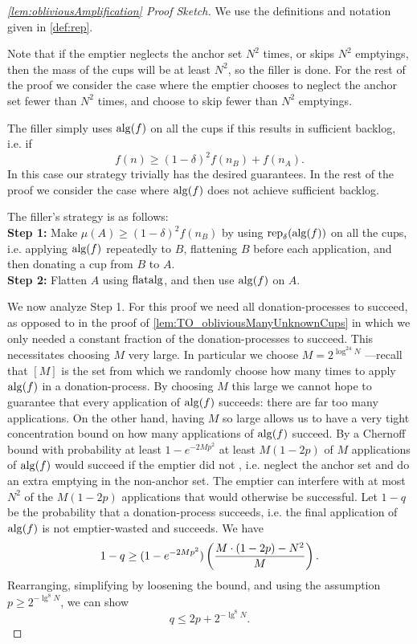\begin{proof}[\cref{lem:obliviousAmplification} Proof Sketch]
  We use the definitions and notation given in \cref{def:rep}. 

  Note that if the emptier neglects the anchor set $N^2$ times,
  or skips $N^2$ emptyings, then the mass of the cups will be at
  least $N^2$, so the filler is done. For the rest of the proof
  we consider the case where the emptier chooses to neglect
  the anchor set fewer than $N^2$ times, and choose to skip fewer
  than $N^2$ emptyings.

  The filler simply uses $\operatorname{\text{\textup{alg}}}(f)$ on all the cups if this
  results in sufficient backlog, i.e. if
  $$f(n) \ge (1-\delta)^2 f(n_B) + f(n_A).$$
  In this case our strategy trivially has the desired guarantees. 
  In the rest of the proof we consider the case where $\operatorname{\text{\textup{alg}}}(f)$
  does not achieve sufficient backlog.

  The filler's strategy is as follows:\\
  \textbf{Step 1:} Make $\mu(A) \ge (1-\delta)^2 f(n_B)$ by
  using $\operatorname{\text{\textup{rep}}}_\delta(\operatorname{\text{\textup{alg}}}(f))$ on all the cups,
  i.e. applying $\operatorname{\text{\textup{alg}}}(f)$ repeatedly to $B$, flattening $B$ before
  each application, and then donating a cup from $B$ to $A$.\\
  \textbf{Step 2:} Flatten $A$ using $\operatorname{\text{\textup{flatalg}}}$, and then use
  $\operatorname{\text{\textup{alg}}}(f)$ on $A$.

  We now analyze Step 1.
  For this proof we need all donation-processes to succeed, as
  opposed to in the proof of
  \cref{lem:TO_obliviousManyUnknownCups} in which we only needed
  a constant fraction of the donation-processes to succeed. This
  necessitates choosing $M$ very large. In particular we choose
  $M = 2^{\log^{24} N}$ ---recall that $[M]$ is the set from
  which we randomly choose how many times to apply $\operatorname{\text{\textup{alg}}}(f)$ in a
  donation-process. By choosing $M$ this large we cannot hope to
  guarantee that every application of $\operatorname{\text{\textup{alg}}}(f)$ succeeds: there
  are far too many applications. On the other hand, having $M$ so
  large allows us to have a very tight concentration bound on how
  many applications of $\operatorname{\text{\textup{alg}}}(f)$ succeed. By a Chernoff bound
  with probability at least $1-e^{-2Mp^2}$ at least $M(1-2p)$ of
  $M$ applications of $\operatorname{\text{\textup{alg}}}(f)$ would succeed if the emptier did
  not , i.e. neglect the anchor set and do an
  extra emptying in the non-anchor set. The emptier can interfere
  with at most $N^2$ of the $M(1-2p)$ applications that would
  otherwise be successful. Let $1-q$ be the probability that a
  donation-process succeeds, i.e. the final application of
  $\operatorname{\text{\textup{alg}}}(f)$ is not emptier-wasted and succeeds. We have $$1-q \ge
  (1-e^{-2Mp^2})\left( \frac{M\cdot (1-2p)-N^2}{M} \right).$$
  Rearranging, simplifying by loosening the bound, and using the
  assumption $p \ge 2^{-\lg^8 N}$, we can show $$q \le 2p +
  2^{-\lg^8 N}.$$


\end{proof}
